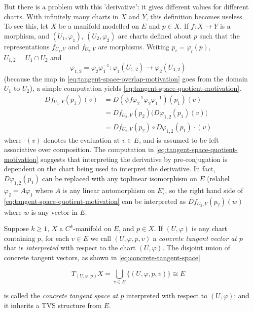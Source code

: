 \documentclass[../main-v2-manifolds.tex]{subfiles}
\begin{document}
But there is a problem with this 'derivative': it gives different values for different charts. With infinitely many charts in $X$ and $Y$, this definition becomes useless. To see this, let $X$ be a manifold modelled on $E$ and $p\in X$. If $f: X\to Y$ is a morphism, and $(U_1,\varphi_1)$, $(U_2,\varphi_2)$ are charts defined about $p$ such that the representations $f_{U_1, V}$ and $f_{U_2, V}$ are morphisms. Writing $p_i = \varphi_i (p)$, $U_{1,2} = U_1\cap U_2$ and
\begin{equation}\label{eq:tangent-space-overlap-motivation}
    \varphi_{1,2}=\varphi_2\varphi_{1}^{-1}: \varphi_1(U_{1,2})\to \varphi_2(U_{1,2})
\end{equation}
(because the map in \cref{eq:tangent-space-overlap-motivation} goes from the domain $U_1$ to $U_2$), a simple computation yields \cref{eq:tangent-space-quotient-motivation}.
\begin{align}
    Df_{U_1, V}(p_1)(v) &= D(\psi f \varphi_2^{-1}\varphi_2\varphi_1^{-1})(p_1)(v) \nonumber\\
    &= Df_{U_2,V}(p_2)\biggl(D\varphi_{1,2}(p_1)(v)\biggr)\nonumber\\
    &= Df_{U_2,V}(p_2)\circ D\varphi_{1,2}(p_1)\cdot (v)\label{eq:tangent-space-quotient-motivation}
\end{align}
where $\cdot(v)$ denotes the evaluation at $v\in E$, and is assumed to be left associative over composition. The computation in \cref{eq:tangent-space-quotient-motivation} suggests that interpreting the derivative by pre-conjugation is dependent on the chart being used to interpret the derivative. In fact, $D\varphi_{1,2}(p_1)$ can be replaced with any toplinear isomorphism on $E$ (relabel $\varphi_2 = A\varphi_1$ where $A$ is any linear automorphism on $E$), so the right hand side of \cref{eq:tangent-space-quotient-motivation} can be interpreted as $Df_{U_2,V}(p_2)(w)$ where $w$ is any vector in $E$. 

\begin{definition}\label{def:concrete-tangent-vector}
    Suppose $k\geq 1$, $X$ a $C^k$-manifold on $E$, and $p\in X$. If $(U,\varphi)$ is any chart containing $p$, for each $v\in E$ we call $(U,\varphi,p,v)$ a \emph{concrete tangent vector at $p$} that is \emph{interpreted} with respect to the chart $(U,\varphi)$. The disjoint union of concrete tangent vectors, as shown in \cref{eq:concrete-tangent-space}

    \begin{equation}\label{eq:concrete-tangent-space}
        T_{(U,\varphi,p)}X = \bigcup_{v\in E}\{(U,\varphi,p,v)\}\cong E
    \end{equation}

    is called the \emph{concrete tangent space at $p$} interpreted with respect to $(U,\varphi)$; and it inherits a TVS structure from $E$.
\end{definition}
\end{document}
